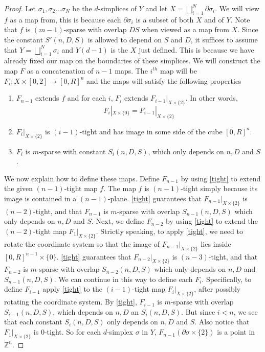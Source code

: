 \documentclass[12pt]{article}
\newcommand{\ZZ}{\mathbb{Z}}
\begin{document}
	\begin{proof} Let $\sigma_1, \sigma_2 \ldots \sigma_N$ be the $d$-simplices of $Y$ and let $X = \bigsqcup_{i=1}^N \partial \sigma_i$. We will view $f$ as a map from, this is because each $\partial \sigma_i$ is a subset of both $X$ and of $Y$. Note that $f$ is $(m-1)$-sparse with overlap $DS$ when viewed as a map from $X$. Since the constant $S'(n,D,S)$ is allowed to depend on $S$ and $D$, it suffices to assume that $Y = \bigsqcup_{i=1}^N \sigma_i$ and $Y(d-1)$ is the $X$ just defined. This is because we have already fixed our map on the boundaries of these simplices. We will construct the map $F$ as a concatenation of $n-1$ maps. The  $i^{th}$ map will be $F_i: X \times [0,2] \to [0,R]^n$ and the maps will satisfy the following properties
		
		\begin{enumerate}
			\item $F_{n-1}$ extends $f$ and for each $i$, $F_i$ extends $F_{i-1}|_{X \times \{2\}}$. In other words, 
			$$F_i|_{X \times \{0\}} = F_{i-1}|_{X \times \{2\}}$$
			\item $F_i|_{X \times \{2\}}$ is $(i-1)$-tight and has image in some side of the cube $[0,R]^n$.
			\item $F_i$ is $m$-sparse with constant $S_i(n,D,S)$, which only depends on $n,D$ and $S$.
		\end{enumerate}
		
		We now explain how to define these maps. Define $F_{n-1}$ by using \cref{tight} to extend the given $(n-1)$-tight map $f$. The map $f$ is $(n-1)$-tight simply because its image is contained in a $(n-1)$-plane. \cref{tight} guarantees that $F_{n-1}|_{X \times \{2\}}$ is $(n-2)$-tight, and that $F_{n-1}$ is $m$-sparse with overlap $S_{n-1}(n,D,S)$ which only depends on $n,D$ and $S$. Next, we define $F_{n-2}$ by using \cref{tight} to extend the $(n-2)$-tight map $F_1|_{X \times \{2\}}$. Strictly speaking, to apply \cref{tight}, we need to rotate the coordinate system so that the image of $F_{n-1}|_{X \times \{2\}}$ lies inside $[0,R]^{n-1} \times \{0\}$. \cref{tight} guarantees that $F_{n-2}|_{X \times \{2\}}$ is $(n-3)$-tight, and that $F_{n-2}$ is $m$-sparse with overlap $S_{n-2}(n,D,S)$ which only depends on $n,D$ and $S_{n-1}(n,D,S)$. We can continue in this way to define each $F_i$. Specifically, to define $F_{i-1}$ apply \cref{tight} to the $(i-1)$-tight map $F_i|_{X \times \{2\}}$, after possibly rotating the coordinate system. By \cref{tight}, $F_{i-1}$ is $m$-sparse with overlap $S_{i-1}(n,D,S)$, which depends on $n,D$ an $S_i(n,D,S)$. But since $i < n$, we see that each constant $S_{i}(n,D,S)$ only depends on $n,D$ and $S$. Also notice that $F_{1}|_{X \times \{2\}}$ is $0$-tight. So for each $d$-simplex $\sigma$ in $Y$, $F_{n-1}(\partial \sigma \times \{2\})$ is a point in $\ZZ^n$. 
		

\end{proof}
\end{document}
